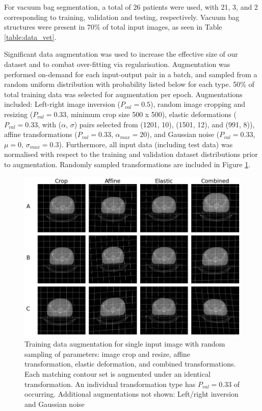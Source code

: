 

For vacuum bag segmentation, a total of 26 patients were used, with 21, 3, and 2 corresponding to training, validation and testing, respectively. Vacuum bag structures were present in 70\% of total input images, as seen in Table \ref{table:data_vet}.




Significant data augmentation was used to increase the effective size of our dataset and to combat over-fitting via regularisation.
Augmentation was performed on-demand for each input-output pair in a batch, and sampled from a random uniform distribution with probability listed below for each type. 50\% of total training data was selected for augmentation per epoch. Augmentations included: Left-right image inversion ($P_{val}=0.5$), random image cropping and resizing ($P_{val}=0.33$, minimum crop size 500 x 500), elastic deformations ($P_{val}=0.33$, with ($\alpha$, $\sigma$) pairs selected from (1201, 10), (1501, 12), and (991, 8)), affine transformations ($P_{val}=0.33$, $\alpha_{max}=20$), and Gaussian noise ($P_{val}=0.33$, $\mu=0$, $\sigma_{max}=0.3$). Furthermore, all input data (including test data) was normalised with respect to the training and validation dataset distributions prior to augmentation. Randomly sampled transformations are included in Figure \ref{fig:augment}.

\begin{figure}[H]
	\begin{center}
		\includegraphics[width=1\textwidth]{figures/augment}
		\caption{Training data augmentation for single input image with random sampling of parameters: image crop and resize, affine transformation, elastic deformation, and combined transformations. Each matching contour set is augmented under an identical transformation. An individual transformation type has $P_{val}=0.33$ of occurring. Additional augmentations not shown: Left/right inversion and Gaussian noise}
		\label{fig:augment}
	\end{center}
\end{figure}

